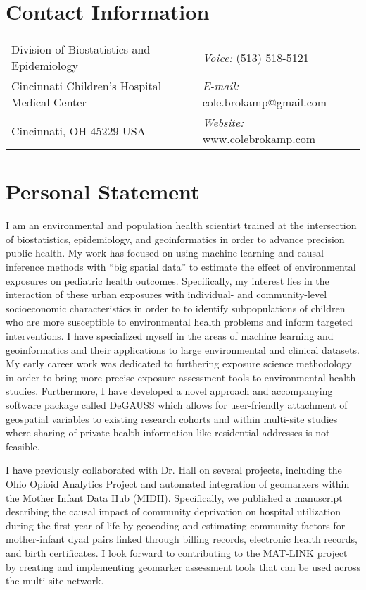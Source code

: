 \documentclass[margin,line]{res}
\begin{document}

\begin{resume}
\section{\sc Contact Information}
\vspace{.05in}
\begin{tabular}{@{}p{3in}p{4in}}
Division of Biostatistics and Epidemiology & {\it Voice:}  (513) 518-5121 \\
Cincinnati Children's Hospital Medical Center & {\it E-mail:}  cole.brokamp@gmail.com\\
Cincinnati, OH 45229 USA  & {\it Website:} www.colebrokamp.com \\
\end{tabular}


\section{\sc Personal Statement}
I am an environmental and population health scientist trained at the
intersection of biostatistics, epidemiology, and geoinformatics in order to
advance precision public health. My work has focused on using
machine learning and causal inference methods with ``big spatial data'' to
estimate the effect of environmental exposures on pediatric health
outcomes. Specifically, my interest lies in the
interaction of these urban exposures with individual- and community-level
socioeconomic characteristics in order to to identify subpopulations of children
who are more susceptible to environmental health problems and inform targeted
interventions. I have specialized myself in the areas of machine learning and geoinformatics and their applications to large environmental and
clinical datasets. My early career work was dedicated to furthering exposure science methodology in
order to bring more precise exposure assessment tools to environmental health
studies. Furthermore, I have developed a novel approach and
accompanying software package called DeGAUSS which allows for user-friendly
attachment of geospatial variables to existing research cohorts and within
multi-site studies where sharing of private health information like residential
addresses is not feasible.

I have previously collaborated with Dr. Hall on
several projects, including the Ohio Opioid Analytics Project and automated
integration of geomarkers within the Mother Infant Data Hub (MIDH).
Specifically, we published a manuscript describing the causal impact of
community deprivation on hospital utilization during the first year of life by
geocoding and estimating community factors for mother-infant dyad pairs linked
through billing records, electronic health records, and birth certificates. I
look forward to contributing to the MAT-LINK project by creating and
implementing geomarker assessment tools that can be used across the multi-site network.



\end{resume}
\end{document}
